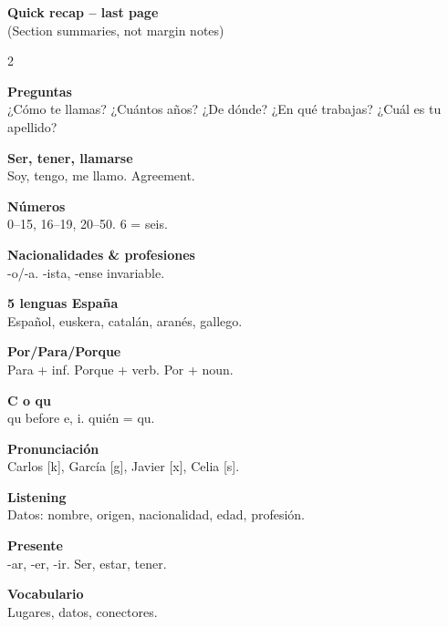 \documentclass[8pt,landscape,a4paper]{article}
\begin{document}
\newpage
\vspace*{0.3em}
\begin{center}
\textbf{\color{eublue}Quick recap -- last page}\\[0.3em]
\small\textcolor{notegrey}{(Section summaries, not margin notes)}
\end{center}
\vspace{0.4em}
\noindent\color{notegrey}
\setlength{\parskip}{0.3em}
\begin{multicols}{2}

\textbf{Preguntas}\\
¿C\'omo te llamas? ¿Cu\'antos a\~nos? ¿De d\'onde? ¿En qu\'e trabajas? ¿Cu\'al es tu apellido?

\textbf{Ser, tener, llamarse}\\
Soy, tengo, me llamo. Agreement.

\textbf{N\'umeros}\\
0--15, 16--19, 20--50. 6 = seis.

\textbf{Nacionalidades \& profesiones}\\
-o/-a. -ista, -ense invariable.

\textbf{5 lenguas Espa\~na}\\
Espa\~nol, euskera, catal\'an, aran\'es, gallego.

\textbf{Por/Para/Porque}\\
Para + inf. Porque + verb. Por + noun.

\textbf{C o qu}\\
qu before e, i. qui\'en = qu.

\textbf{Pronunciaci\'on}\\
Carlos [k], Garc\'ia [g], Javier [x], Celia [s].

\textbf{Listening}\\
Datos: nombre, origen, nacionalidad, edad, profesi\'on.

\textbf{Presente}\\
-ar, -er, -ir. Ser, estar, tener.

\textbf{Vocabulario}\\
Lugares, datos, conectores.

\end{multicols}
\vfill
\normalsize\normalfont\color{black}
\end{document}

